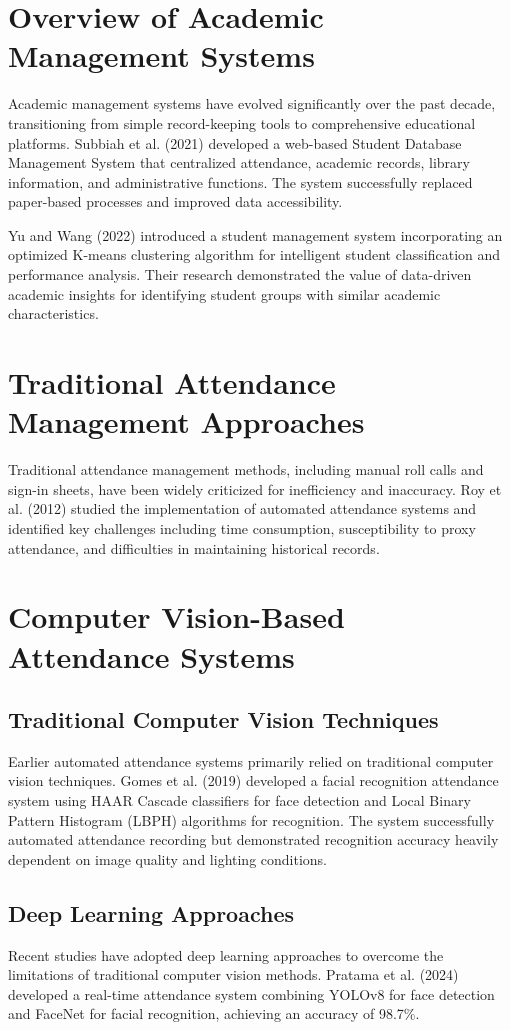 \documentclass[12pt,a4paper,oneside]{report}
\let\oldsection\section
\renewcommand{\section}{\clearpage\oldsection}
\begin{document}
\section{Overview of Academic Management Systems}
Academic management systems have evolved significantly over the past decade, transitioning from simple record-keeping tools to comprehensive educational platforms. Subbiah et al. (2021) developed a web-based Student Database Management System that centralized attendance, academic records, library information, and administrative functions. The system successfully replaced paper-based processes and improved data accessibility.

Yu and Wang (2022) introduced a student management system incorporating an optimized K-means clustering algorithm for intelligent student classification and performance analysis. Their research demonstrated the value of data-driven academic insights for identifying student groups with similar academic characteristics.

\section{Traditional Attendance Management Approaches}
Traditional attendance management methods, including manual roll calls and sign-in sheets, have been widely criticized for inefficiency and inaccuracy. Roy et al. (2012) studied the implementation of automated attendance systems and identified key challenges including time consumption, susceptibility to proxy attendance, and difficulties in maintaining historical records.

\section{Computer Vision-Based Attendance Systems}
\subsection{Traditional Computer Vision Techniques}
Earlier automated attendance systems primarily relied on traditional computer vision techniques. Gomes et al. (2019) developed a facial recognition attendance system using HAAR Cascade classifiers for face detection and Local Binary Pattern Histogram (LBPH) algorithms for recognition. The system successfully automated attendance recording but demonstrated recognition accuracy heavily dependent on image quality and lighting conditions.

\subsection{Deep Learning Approaches}
Recent studies have adopted deep learning approaches to overcome the limitations of traditional computer vision methods. Pratama et al. (2024) developed a real-time attendance system combining YOLOv8 for face detection and FaceNet for facial recognition, achieving an accuracy of 98.7\%.
\end{document}
